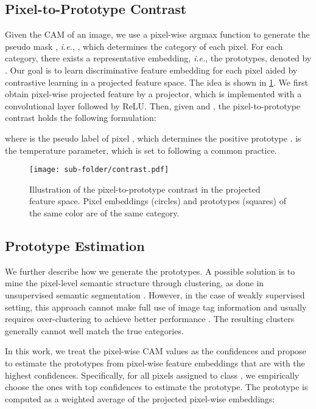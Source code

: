 \documentclass[10pt,twocolumn,letterpaper]{article}
\begin{document}
\subsection{Pixel-to-Prototype Contrast}
Given the CAM of an image, we use a pixel-wise argmax function to generate the pseudo mask , \textit{i.e.}, , which determines the category of each pixel.
For each category, there exists a representative embedding, \textit{i.e.}, the prototypes, denoted by .
Our goal is to learn discriminative feature embedding for each pixel aided by contrastive learning in a projected feature space.
The idea is shown in \cref{fig:contrast}.
We first obtain pixel-wise projected feature  by a projector, which is implemented with a  convolutional layer followed by ReLU. 
Then, given  and , the pixel-to-prototype contrast  holds the following formulation:

where  is the pseudo label of pixel , which determines the positive prototype .
 is the temperature parameter, which is set to  following a common practice.
\begin{figure}[t]
\centering
\begin{center}
\texttt{[image: sub-folder/contrast.pdf]}
\end{center}
\caption{Illustration of the pixel-to-prototype contrast in the projected feature space. Pixel embeddings (circles) and prototypes (squares) of the same color are of the same category.}
\label{fig:contrast}
\end{figure}

\subsection{Prototype Estimation}
We further describe how we generate the prototypes.
A possible solution is to mine the pixel-level semantic structure through clustering, as done in unsupervised semantic segmentation \cite{picie}.
However, in the case of weakly supervised setting, this approach cannot make full use of image tag information and usually requires over-clustering to achieve better performance \cite{chang2020weaklySubCategory, tian2017deepcluster}. The resulting clusters generally cannot well match the true categories. 


In this work, we treat the pixel-wise CAM values as the confidences and propose to estimate the prototypes from pixel-wise feature embeddings that are with the highest confidences.
Specifically, for all pixels assigned to class ,
we empirically choose the ones with top  confidences to estimate the prototype.
The prototype  is computed as a weighted average of the projected pixel-wise embeddings:
\end{document}
